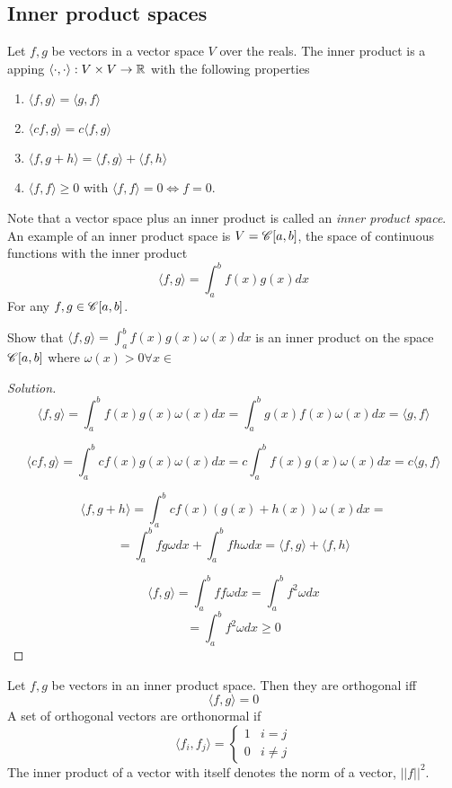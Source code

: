 \subsection{Inner product spaces}
\begin{definition}
  Let $f,g$ be vectors in a vector space $V$ over the reals. The inner product is a
  apping $\langle  \cdot, \cdot\rangle :V\times V \to \mathbb R $ with the following properties
  \begin{enumerate}
    \item $\langle f,g \rangle =\langle g,f \rangle$
    \item $\langle cf, g \rangle = c\langle f,g \rangle $
    \item $\langle f,g+h \rangle =\langle f,g \rangle +\langle f,h\rangle $
    \item $\langle f,f \rangle \geq 0$ with $\langle f,f \rangle =0 \iff f=0$.
  \end{enumerate}
  \label{def:innerProd}
\end{definition}
Note that a vector space plus an inner product is called an \emph{inner product space}. An
example of an inner product space is $V=\mathscr C[a,b]$, the space of continuous functions with
the inner product
\[\langle f,g \rangle =\int_a^b f(x)g(x) dx\]
For any $f,g\in \mathscr C[a,b]$.

\begin{example}
  Show that $\langle f,g \rangle =\int_a^b f(x)g(x)\omega(x) dx$ is an inner product on
  the space $\mathscr C[a,b]$ where $\omega(x)>0\forall x\in $
\end{example}
\begin{proof}[Solution]
  \[\langle f,g \rangle =\int_a^bf(x)g(x)\omega(x) dx = \int_{a}^b
  g(x)f(x)\omega(x)dx=\langle g,f \rangle \]

  \[\langle cf,g \rangle =\int_a^bcf(x)g(x)\omega(x) dx = c\int_{a}^b
  f(x)g(x)\omega(x)dx=c\langle g,f \rangle \]

  \[\langle f,g+h \rangle =\int_a^bcf(x)(g(x)+h(x))\omega(x) dx = \]
  \[= \int_a^bfg\omega dx + \int_a^b fh\omega dx = \langle f,g \rangle +\langle f,h
  \rangle \]

  \[\langle f,g \rangle = \int_a^b ff\omega dx = \int_a^b f^2 \omega dx \]
  \[= \int_a^b f^2\omega dx \geq 0\]
\end{proof}


\begin{definition}
  Let $f,g$ be vectors in an inner product space. Then they are orthogonal iff
  \[\langle f,g \rangle =0\]
  A set of orthogonal vectors are orthonormal if
  \[\langle f_i,f_j \rangle = 
    \begin{cases}
        1 & i=j \\
        0 & i\neq j
    \end{cases}\]
  The inner product of a vector with itself denotes the norm of a vector, $||f||^2$.
  \label{def:orthonormalSet}
\end{definition}

